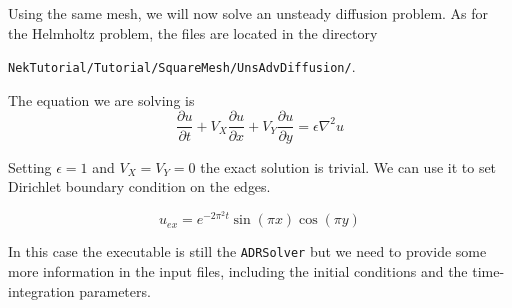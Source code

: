 \documentclass[a4paper,12pt]{article}
\begin{document}
Using the same mesh, we will now solve an unsteady diffusion
problem. As for the Helmholtz problem, the files are located in the directory

\texttt{NekTutorial/Tutorial/SquareMesh/UnsAdvDiffusion/}.

The equation we are solving is
\begin{equation}
\frac{\partial u}{\partial t} + V_X \frac{\partial u}{\partial x} 
    + V_Y \frac{\partial u}{\partial y} = \epsilon \nabla^2 u
\end{equation}

Setting $\epsilon = 1$ and $V_X=V_Y=0$ the exact solution is trivial.
We can use it to set Dirichlet boundary condition on the edges.

\begin{equation}
u_{ex}= e^{-2\pi^2 t}\sin(\pi x)\cos(\pi y)
\end{equation}

In this case the executable is still the \texttt{ADRSolver} but we need to
provide some more information in the input files, including the initial
conditions and the time-integration parameters.
\end{document}
